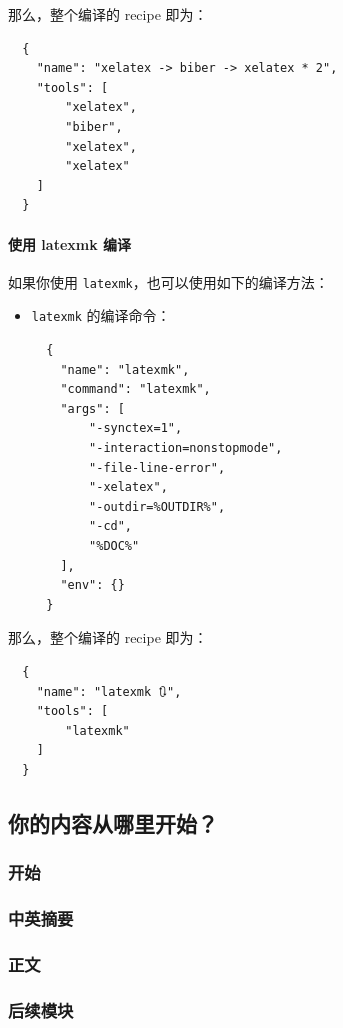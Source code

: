 那么，整个编译的 recipe 即为：

\begin{verbatim}
  {
    "name": "xelatex -> biber -> xelatex * 2",
    "tools": [
        "xelatex",
        "biber",
        "xelatex",
        "xelatex"
    ]
  }
\end{verbatim}

\paragraph{使用 latexmk 编译}
如果你使用 \texttt{latexmk}，也可以使用如下的编译方法：

\begin{itemize}
  \item \texttt{latexmk} 的编译命令：
  \begin{verbatim}
  {
    "name": "latexmk",
    "command": "latexmk",
    "args": [
        "-synctex=1",
        "-interaction=nonstopmode",
        "-file-line-error",
        "-xelatex",
        "-outdir=%OUTDIR%",
        "-cd",
        "%DOC%"
    ],
    "env": {}
  }
  \end{verbatim}
\end{itemize}

那么，整个编译的 recipe 即为：
\begin{verbatim}
  {
    "name": "latexmk 🔃",
    "tools": [
        "latexmk"
    ]
  }
\end{verbatim}

\subsection{你的内容从哪里开始？}

\subsubsection{开始}

\subsubsection{中英摘要}

\subsubsection{正文}

\subsubsection{后续模块}

